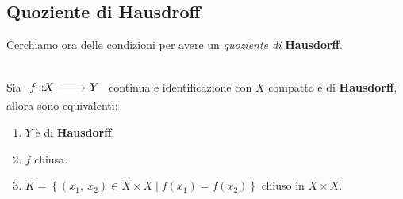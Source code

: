 \subsection{Quoziente di Hausdroff}
Cerchiamo ora delle condizioni per avere un \textit{quoziente di} \textbf{Hausdorff}.
\begin{theorema}~{}\label{quozientehausdorff}\\
Sia $\funz f X Y$ continua e identificazione con $X$ compatto e di \textbf{Hausdorff}, allora sono equivalenti:
		\begin{enumerate}
			\item $Y$ è di \textbf{Hausdorff}.
			\item $f$ chiusa.
			\item $K=\left\{ (x_1,\ x_2)\in X\times X \mid f(x_1)=f(x_2) \right\}$ chiuso in $X\times X$.
		\end{enumerate}
	\vspace{-3mm}
\end{theorema}

